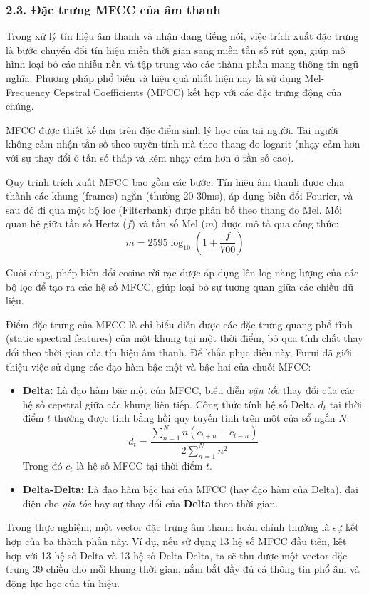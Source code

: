 \subsubsection{2.3. Đặc trưng MFCC của âm thanh}
\indent\indent Trong xử lý tín hiệu âm thanh và nhận dạng tiếng nói, việc trích xuất đặc trưng là bước chuyển đổi tín hiệu miền thời gian sang miền tần số rút gọn, giúp mô hình loại bỏ các nhiễu nền và tập trung vào các thành phần mang thông tin ngữ nghĩa. Phương pháp phổ biến và hiệu quả nhất hiện nay là sử dụng Mel-Frequency Cepstral Coefficients (MFCC) kết hợp với các đặc trưng động của chúng.\vspace{0.3cm}

MFCC \cite{davis1980comparison} được thiết kế dựa trên đặc điểm sinh lý học của tai người. Tai người không cảm nhận tần số theo tuyến tính mà theo thang đo logarit (nhạy cảm hơn với sự thay đổi ở tần số thấp và kém nhạy cảm hơn ở tần số cao).\vspace{0.3cm}

Quy trình trích xuất MFCC bao gồm các bước: Tín hiệu âm thanh được chia thành các khung (frames) ngắn (thường 20-30ms), áp dụng biến đổi Fourier, và sau đó đi qua một bộ lọc (Filterbank) được phân bố theo thang đo Mel. Mối quan hệ giữa tần số Hertz ($f$) và tần số Mel ($m$) được mô tả qua công thức:\vspace{-0.1cm}
\[
    m = 2595 \log_{10}\left(1 + \frac{f}{700}\right)
\]

Cuối cùng, phép biến đổi cosine rời rạc được áp dụng lên log năng lượng của các bộ lọc để tạo ra các hệ số MFCC, giúp loại bỏ sự tương quan giữa các chiều dữ liệu.\vspace{0.3cm}

Điểm đặc trưng của MFCC là chỉ biểu diễn được các đặc trưng quang phổ tĩnh (static spectral features) của một khung tại một thời điểm, bỏ qua tính chất thay đổi theo thời gian của tín hiệu âm thanh. Để khắc phục điều này, Furui \cite{furui1986speaker} đã giới thiệu việc sử dụng các đạo hàm bậc một và bậc hai của chuỗi MFCC:\vspace{-0.1cm}
\begin{itemize}[label={--}, itemsep=1pt]
    \item \textbf{Delta:} Là đạo hàm bậc một của MFCC, biểu diễn \textit{vận tốc} thay đổi của các hệ số cepstral giữa các khung liên tiếp. Công thức tính hệ số Delta $d_t$ tại thời điểm $t$ thường được tính bằng hồi quy tuyến tính trên một cửa sổ ngắn $N$:
    \[
        d_t = \frac{\sum_{n=1}^{N} n (c_{t+n} - c_{t-n})}{2 \sum_{n=1}^{N} n^2}
    \]
    Trong đó $c_t$ là hệ số MFCC tại thời điểm $t$.
    
    \item \textbf{Delta-Delta:} Là đạo hàm bậc hai của MFCC (hay đạo hàm của Delta), đại diện cho \textit{gia tốc} hay sự thay đổi của \textbf{Delta} theo thời gian.
\end{itemize}

Trong thực nghiệm, một vector đặc trưng âm thanh hoàn chỉnh thường là sự kết hợp của ba thành phần này. Ví dụ, nếu sử dụng 13 hệ số MFCC đầu tiên, kết hợp với 13 hệ số Delta và 13 hệ số Delta-Delta, ta sẽ thu được một vector đặc trưng 39 chiều cho mỗi khung thời gian, nắm bắt đầy đủ cả thông tin phổ âm và động lực học của tín hiệu.